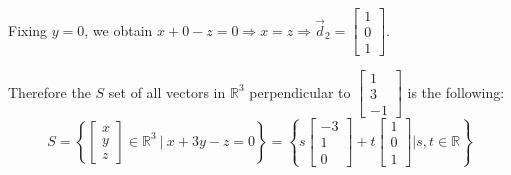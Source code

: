 \begin{SaveQuestion}
    Fixing $y = 0$, we obtain $x + 0 - z = 0 \Longrightarrow x = z \Longrightarrow \vec d_2 = \begin{bmatrix} 1 \\ 0 \\ 1 \end{bmatrix}$.

    
    
    Therefore the $S$ set of all vectors in $\mathbb{R}^3$ perpendicular to $\begin{bmatrix} 1 \\ 3 \\ -1 \end{bmatrix}$ is the following:
    $$S = \left\{\begin{bmatrix} x \\ y \\ z \end{bmatrix} \in \mathbb{R}^3 \ | \ x+3y-z=0\right\} = \left\{s \begin{bmatrix} -3 \\ 1 \\ 0 \end{bmatrix} + t \begin{bmatrix} 1 \\ 0 \\ 1 \end{bmatrix} | s,t \in \mathbb{R}\right\}$$
\end{SaveQuestion}


